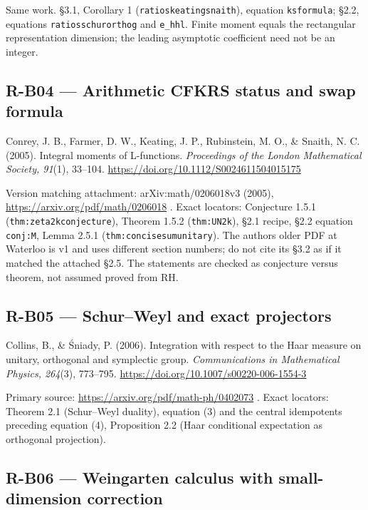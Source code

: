 \documentclass[11pt,a4paper]{article}
\theoremstyle{definition}\newtheorem{definition}{Definition}
\begin{document}
Same work. §3.1, Corollary 1 (\nolinkurl{ratioskeatingsnaith}), equation
\nolinkurl{ksformula}; §2.2, equations \nolinkurl{ratiosschurorthog} and
\nolinkurl{e_hhl}. Finite moment equals the rectangular representation
dimension; the leading asymptotic coefficient need not be an integer.

\subsection{R-B04 --- Arithmetic CFKRS status and swap
formula}\label{r-b04--arithmetic-cfkrs-status-and-swap-formula}

Conrey, J. B., Farmer, D. W., Keating, J. P., Rubinstein, M. O., \&
Snaith, N. C. (2005). Integral moments of L-functions. \emph{Proceedings
of the London Mathematical Society, 91}(1), 33--104.
\url{https://doi.org/10.1112/S0024611504015175}

Version matching attachment: arXiv:math/0206018v3 (2005),
\url{https://arxiv.org/pdf/math/0206018} . Exact locators: Conjecture
1.5.1 (\nolinkurl{thm:zeta2kconjecture}), Theorem 1.5.2
(\nolinkurl{thm:UN2k}), §2.1 recipe, §2.2 equation \nolinkurl{conj:M}, Lemma
2.5.1 (\nolinkurl{thm:concisesumunitary}). The author\textquotesingle s
older PDF at Waterloo is v1 and uses different section numbers; do not
cite its §3.2 as if it matched the attached §2.5. The statements are
checked as conjecture versus theorem, not assumed proved from RH.

\subsection{R-B05 --- Schur--Weyl and exact
projectors}\label{r-b05--schurweyl-and-exact-projectors}

Collins, B., \& Śniady, P. (2006). Integration with respect to the Haar
measure on unitary, orthogonal and symplectic group.
\emph{Communications in Mathematical Physics, 264}(3), 773--795.
\url{https://doi.org/10.1007/s00220-006-1554-3}

Primary source: \url{https://arxiv.org/pdf/math-ph/0402073} . Exact
locators: Theorem 2.1 (Schur--Weyl duality), equation (3) and the
central idempotents preceding equation (4), Proposition 2.2 (Haar
conditional expectation as orthogonal projection).

\subsection{R-B06 --- Weingarten calculus with small-dimension
correction}\label{r-b06--weingarten-calculus-with-small-dimension-correction}
\end{document}
